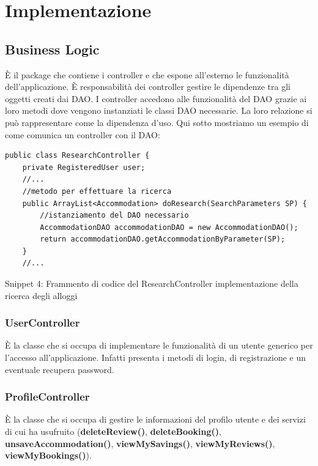 \documentclass[10pt]{article}
\begin{document}
\section{Implementazione}
\subsection{Business Logic}

\`E il package che contiene i controller e che espone all'esterno le funzionalit\`a dell'applicazione. \`E responsabilit\`a dei controller gestire le dipendenze tra gli oggetti creati dai DAO. I controller accedono alle funzionalit\`a del DAO grazie ai loro metodi dove vengono instanziati le classi DAO necessarie. La loro relazione si pu\`o rappresentare come la dipendenza d'uso.
Qui sotto mostriamo un esempio di come comunica un controller con il DAO:
\clearpage
\begin{lstlisting}
public class ResearchController {
    private RegisteredUser user;
    //...
    //metodo per effettuare la ricerca
    public ArrayList<Accommodation> doResearch(SearchParameters SP) {
        //istanziamento del DAO necessario
        AccommodationDAO accommodationDAO = new AccommodationDAO();  
        return accommodationDAO.getAccommodationByParameter(SP);
    }
    //...
\end{lstlisting}
\par\medskip
\begin{center}
Snippet 4: Frammento di codice del ResearchController implementazione della ricerca degli alloggi
\par\medskip
\end{center}
\subsubsection{UserController}

\`E la classe che si occupa di implementare le funzionalit\`a di un utente generico per l'accesso all'applicazione. Infatti presenta i metodi di login, di registrazione e un eventuale recupera password.

\subsubsection{ProfileController}

\`E la classe che si occupa di gestire le informazioni del profilo utente e dei servizi di cui ha usufruito (\textbf{deleteReview()}, \textbf{deleteBooking()}, \textbf{unsaveAccommodation()}, \textbf{viewMySavings()}, \textbf{viewMyReviews()}, \textbf{viewMyBookings()}).
\end{document}
